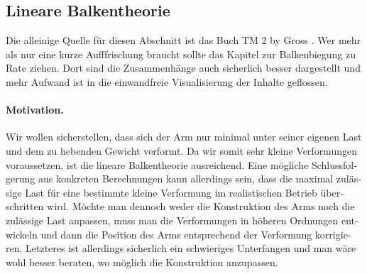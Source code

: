 

\begin{otherlanguage}{ngerman}

\section{Lineare Balkentheorie}
\label{sec:beam-theory}

Die alleinige Quelle für diesen Abschnitt ist das Buch TM 2 by Gross \cite{gross2024tm2}.
Wer mehr als nur eine kurze Aufffrischung braucht sollte das Kapitel zur Balkenbiegung 
zu Rate ziehen. Dort sind die Zusammenhänge auch sicherlich besser dargestellt und mehr 
Aufwand ist in die einwandfreie Visualisierung der Inhalte geflossen. 

\paragraph{Motivation.}
Wir wollen sicherstellen, dass sich der Arm nur minimal unter seiner
eigenen Last und dem zu hebenden Gewicht verformt. Da wir somit sehr
kleine Verformungen voraussetzen, ist die lineare Balkentheorie
ausreichend. Eine mögliche Schlussfolgerung aus konkreten Berechnungen
kann allerdings sein, dass die maximal zulässige Last für eine bestimmte
kleine Verformung im realistischen Betrieb überschritten wird. Möchte man
dennoch weder die Konstruktion des Arms noch die zulässige Last anpassen,
muss man die Verformungen in höheren Ordnungen entwickeln und dann die
Position des Arms entsprechend der Verformung korrigieren. Letzteres ist
allerdings sicherlich ein schwieriges Unterfangen und man wäre wohl besser
beraten, wo möglich die Konstruktion anzupassen.


\end{otherlanguage}
